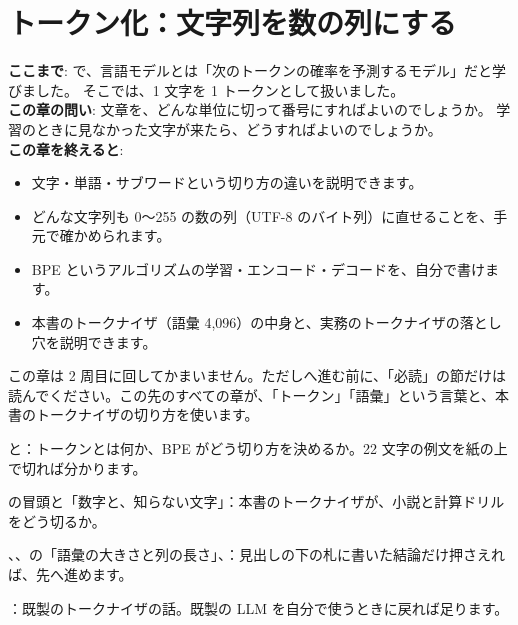 \chapter{トークン化：文字列を数の列にする}\label{ch:tokenizer}

\begin{chapterlead}
\textbf{ここまで}: で、言語モデルとは「次のトークンの確率を予測するモデル」だと学びました。
そこでは、1 文字を 1 トークンとして扱いました。\\[1mm]
\textbf{この章の問い}: 文章を、どんな単位に切って番号にすればよいのでしょうか。
学習のときに見なかった文字が来たら、どうすればよいのでしょうか。\\[1mm]
\textbf{この章を終えると}:
\begin{itemize}
\item 文字・単語・サブワードという切り方の違いを説明できます。
\item どんな文字列も 0〜255 の数の列（UTF-8 のバイト列）に直せることを、手元で確かめられます。
\item BPE というアルゴリズムの学習・エンコード・デコードを、自分で書けます。
\item 本書のトークナイザ（語彙 4,096）の中身と、実務のトークナイザの落とし穴を説明できます。
\end{itemize}
\end{chapterlead}

\begin{readingguide}
\item[\rgpre] この章は 2 周目に回してかまいません。ただしへ進む前に、「必読」の節だけは読んでください。この先のすべての章が、「トークン」「語彙」という言葉と、本書のトークナイザの切り方を使います。
\item[\rgmust] と：トークンとは何か、BPE がどう切り方を決めるか。22 文字の例文を紙の上で切れば分かります。
\item[\rgmust] の冒頭と「数字と、知らない文字」：本書のトークナイザが、小説と計算ドリルをどう切るか。
\item[\rgskim] 、、の「語彙の大きさと列の長さ」、：見出しの下の札に書いた結論だけ押さえれば、先へ進めます。
\item[\rglater] ：既製のトークナイザの話。既製の LLM を自分で使うときに戻れば足ります。
\end{readingguide}

